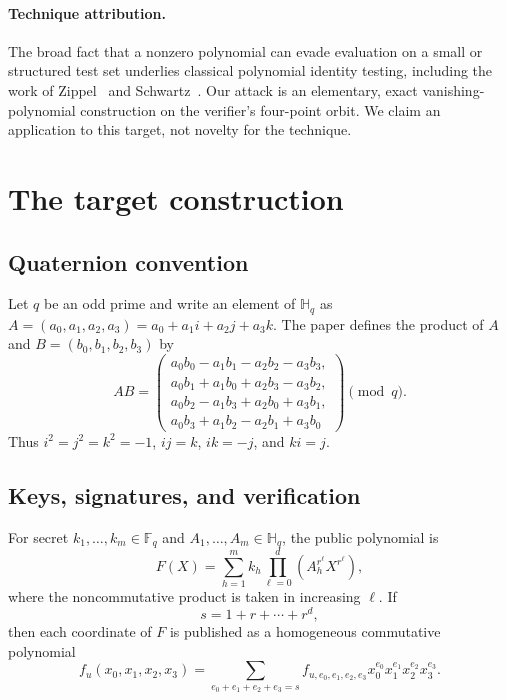 \documentclass[10pt,a4paper]{article}
\newcommand{\F}{\mathbb{F}}
\newcommand{\Hq}{\mathbb{H}_{q}}
\begin{document}
\paragraph{Technique attribution.}
The broad fact that a nonzero polynomial can evade evaluation on a small or
structured test set underlies classical polynomial identity testing, including
the work of Zippel~\cite{zippel} and Schwartz~\cite{schwartz}.  Our attack is
an elementary, exact vanishing-polynomial construction on the verifier's
four-point orbit.  We claim an application to this target, not novelty for the
technique.

\section{The target construction}

\subsection{Quaternion convention}

Let $q$ be an odd prime and write an element of $\Hq$ as
$A=(a_0,a_1,a_2,a_3)=a_0+a_1i+a_2j+a_3k$.  The paper defines the product of
$A$ and $B=(b_0,b_1,b_2,b_3)$ by
\[
AB=\left(\begin{array}{l}
a_0b_0-a_1b_1-a_2b_2-a_3b_3,\\
a_0b_1+a_1b_0+a_2b_3-a_3b_2,\\
a_0b_2-a_1b_3+a_2b_0+a_3b_1,\\
a_0b_3+a_1b_2-a_2b_1+a_3b_0
\end{array}\right) \pmod q.
\]
Thus $i^2=j^2=k^2=-1$, $ij=k$, $ik=-j$, and $ki=j$.

\subsection{Keys, signatures, and verification}

For secret $k_1,\ldots,k_m\in\F_q$ and
$A_1,\ldots,A_m\in\Hq$, the public polynomial is
\begin{equation}
 F(X)=\sum_{h=1}^{m} k_h
       \prod_{\ell=0}^{d}\left(A_h^{r^\ell}X^{r^\ell}\right),
 \label{eq:F}
\end{equation}
where the noncommutative product is taken in increasing $\ell$.  If
\[
 s=1+r+\cdots+r^d,
\]
then each coordinate of $F$ is published as a homogeneous commutative
polynomial
\[
 f_u(x_0,x_1,x_2,x_3)
 =\sum_{e_0+e_1+e_2+e_3=s}
 f_{u,e_0,e_1,e_2,e_3}
 x_0^{e_0}x_1^{e_1}x_2^{e_2}x_3^{e_3}.
\]
\end{document}
